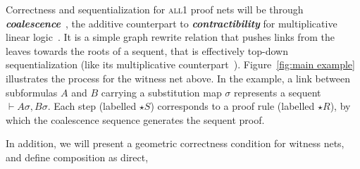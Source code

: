 \documentclass[UKenglish]{lipics-v2016}
\theoremstyle{plain}
\newcommand\defn[1]{\textit{\textbf{#1}}}
\newcommand\all{\textsc{all}}
\newcommand\+{+}
\renewcommand\*{\times}
\newcommand\seq[2]{{\vdash}#1,#2}
\begin{document}
Correctness and sequentialization for \all1 proof nets will be through \defn{coalescence}~\cite{Heijltjes-Hughes-2015,Hughes-Heijltjes-2016}, the additive counterpart to \defn{contractibility} for multiplicative linear logic~\cite{Danos-1990}. It is a simple graph rewrite relation that pushes links from the leaves towards the roots of a sequent, that is effectively top-down sequentialization (like its multiplicative counterpart~\cite{Guerrini-Masini-2001}). Figure~\ref{fig:main example} illustrates the process for the witness net above. In the example, a link between subformulas $A$ and $B$ carrying a substitution map $\sigma$ represents a sequent $\seq{A\sigma}{B\sigma}$. Each step (labelled $\star S$) corresponds to a proof rule (labelled $\star R$), by which the coalescence sequence generates the sequent proof.

In addition, we will present a geometric correctness condition for witness nets, and define composition as direct, 



\end{document}
